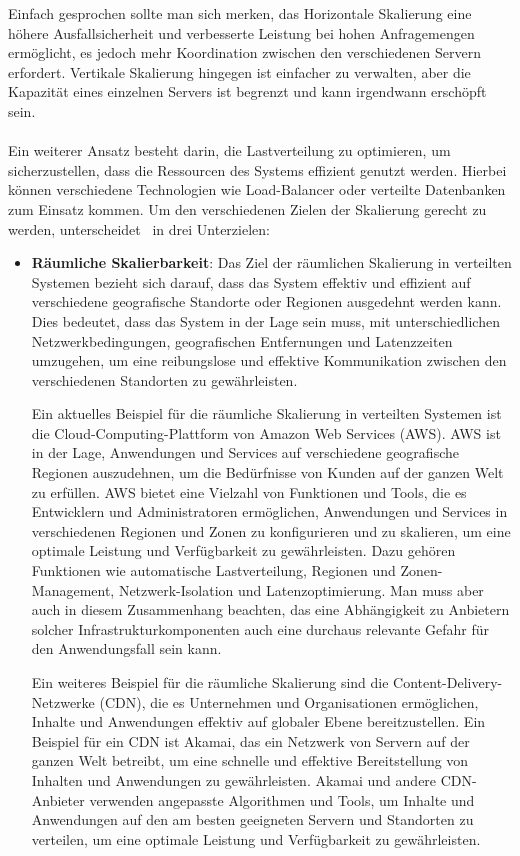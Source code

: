 Einfach gesprochen sollte man sich merken, das Horizontale Skalierung  eine höhere Ausfallsicherheit und verbesserte Leistung bei hohen Anfragemengen ermöglicht, es jedoch mehr Koordination zwischen den verschiedenen Servern erfordert. Vertikale Skalierung hingegen ist einfacher zu verwalten, aber die Kapazität eines einzelnen Servers ist begrenzt und kann irgendwann erschöpft sein.
\\\\
Ein weiterer Ansatz besteht darin, die Lastverteilung zu optimieren, um sicherzustellen, dass die Ressourcen des Systems effizient genutzt werden. Hierbei können verschiedene Technologien wie Load-Balancer oder verteilte Datenbanken zum Einsatz kommen. Um den verschiedenen Zielen der Skalierung gerecht zu werden, unterscheidet~\cite{tanenbaum2017distributed} in drei Unterzielen:
\begin{itemize}
\item \textbf{Räumliche Skalierbarkeit}: Das Ziel der räumlichen Skalierung in verteilten Systemen bezieht sich darauf, dass das System effektiv und effizient auf verschiedene geografische Standorte oder Regionen ausgedehnt werden kann. Dies bedeutet, dass das System in der Lage sein muss, mit unterschiedlichen Netzwerkbedingungen, geografischen Entfernungen und Latenzzeiten umzugehen, um eine reibungslose und effektive Kommunikation zwischen den verschiedenen Standorten zu gewährleisten.

Ein aktuelles Beispiel für die räumliche Skalierung in verteilten Systemen ist die Cloud-Computing-Plattform von Amazon Web Services (AWS). AWS ist in der Lage, Anwendungen und Services auf verschiedene geografische Regionen auszudehnen, um die Bedürfnisse von Kunden auf der ganzen Welt zu erfüllen. AWS bietet eine Vielzahl von Funktionen und Tools, die es Entwicklern und Administratoren ermöglichen, Anwendungen und Services in verschiedenen Regionen und Zonen zu konfigurieren und zu skalieren, um eine optimale Leistung und Verfügbarkeit zu gewährleisten. Dazu gehören Funktionen wie automatische Lastverteilung, Regionen und Zonen-Management, Netzwerk-Isolation und Latenzoptimierung. Man muss aber auch in diesem Zusammenhang beachten, das eine Abhängigkeit zu Anbietern solcher Infrastrukturkomponenten auch eine durchaus relevante Gefahr für den Anwendungsfall sein kann.

Ein weiteres Beispiel für die räumliche Skalierung sind die Content-Delivery-Netzwerke (CDN), die es Unternehmen und Organisationen ermöglichen, Inhalte und Anwendungen effektiv auf globaler Ebene bereitzustellen. Ein Beispiel für ein CDN ist Akamai, das ein Netzwerk von Servern auf der ganzen Welt betreibt, um eine schnelle und effektive Bereitstellung von Inhalten und Anwendungen zu gewährleisten. Akamai und andere CDN-Anbieter verwenden angepasste Algorithmen und Tools, um Inhalte und Anwendungen auf den am besten geeigneten Servern und Standorten zu verteilen, um eine optimale Leistung und Verfügbarkeit zu gewährleisten.


\end{itemize}
